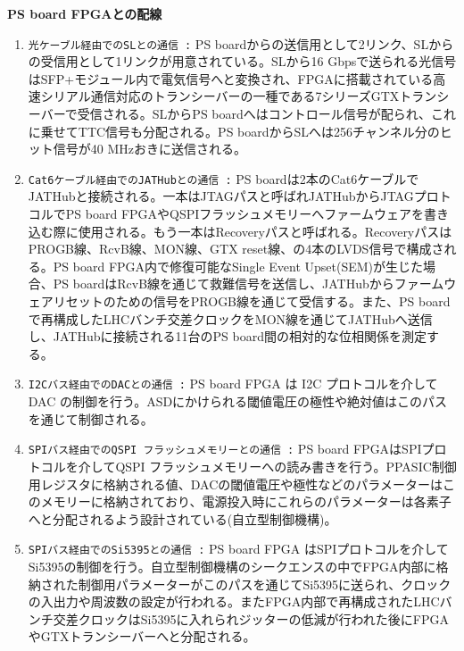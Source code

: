 \textbf{PS board FPGAとの配線}
\begin{enumerate}
    \item \texttt{光ケーブル経由でのSLとの通信 :} PS boardからの送信用として2リンク、SLからの受信用として1リンクが用意されている。SLから16 Gbpsで送られる光信号はSFP+モジュール内で電気信号へと変換され、FPGAに搭載されている高速シリアル通信対応のトランシーバーの一種である7シリーズGTXトランシーバーで受信される。SLからPS boardへはコントロール信号が配られ、これに乗せてTTC信号も分配される。PS boardからSLへは256チャンネル分のヒット信号が40 MHzおきに送信される。
    \baselineskip

    \item \texttt{Cat6ケーブル経由でのJATHubとの通信 :} PS boardは2本のCat6ケーブルでJATHubと接続される。一本はJTAGパスと呼ばれJATHubからJTAGプロトコルでPS board FPGAやQSPIフラッシュメモリーへファームウェアを書き込む際に使用される。もう一本はRecoveryパスと呼ばれる。RecoveryパスはPROGB線、RcvB線、MON線、GTX reset線、の4本のLVDS信号で構成される。PS board FPGA内で修復可能なSingle Event Upset(SEM)が生じた場合、PS boardはRcvB線を通じて救難信号を送信し、JATHubからファームウェアリセットのための信号をPROGB線を通じて受信する。また、PS boardで再構成したLHCバンチ交差クロックをMON線を通じてJATHubへ送信し、JATHubに接続される11台のPS board間の相対的な位相関係を測定する。
    \baselineskip

    \item  \texttt{I2Cバス経由でのDACとの通信 :} PS board FPGA は I2C プロトコルを介して DAC の制御を行う。ASDにかけられる閾値電圧の極性や絶対値はこのパスを通じて制御される。
    \baselineskip

    \item \texttt{SPIバス経由でのQSPI フラッシュメモリーとの通信 :} PS board FPGAはSPIプロトコルを介してQSPI フラッシュメモリーへの読み書きを行う。PPASIC制御用レジスタに格納される値、DACの閾値電圧や極性などのパラメーターはこのメモリーに格納されており、電源投入時にこれらのパラメーターは各素子へと分配されるよう設計されている(自立型制御機構)。
    \baselineskip
    
    \item \texttt{SPIバス経由でのSi5395との通信 :} PS board FPGA はSPIプロトコルを介してSi5395の制御を行う。自立型制御機構のシークエンスの中でFPGA内部に格納された制御用パラメーターがこのパスを通じてSi5395に送られ、クロックの入出力や周波数の設定が行われる。またFPGA内部で再構成されたLHCバンチ交差クロックはSi5395に入れられジッターの低減が行われた後にFPGAやGTXトランシーバーへと分配される。
    \baselineskip


\end{enumerate}
